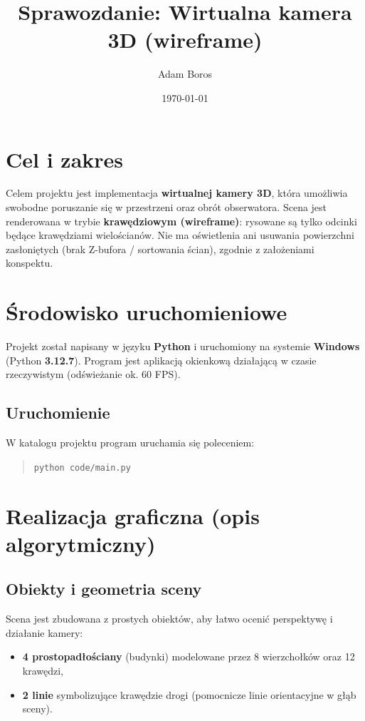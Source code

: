 \documentclass[12pt,a4paper]{article}
\title{Sprawozdanie: Wirtualna kamera 3D (wireframe)}
\author{Adam Boros}
\date{\today}
\begin{document}
\maketitle

\section{Cel i zakres}
Celem projektu jest implementacja \textbf{wirtualnej kamery 3D}, która umożliwia swobodne poruszanie się w przestrzeni oraz obrót obserwatora.
Scena jest renderowana w trybie \textbf{krawędziowym (wireframe)}: rysowane są tylko odcinki będące krawędziami wielościanów.
Nie ma oświetlenia ani usuwania powierzchni zasłoniętych (brak Z-bufora / sortowania ścian), zgodnie z założeniami konspektu.

\section{Środowisko uruchomieniowe}
Projekt został napisany w języku \textbf{Python} i uruchomiony na systemie \textbf{Windows} (Python \textbf{3.12.7}).
Program jest aplikacją okienkową działającą w czasie rzeczywistym (odświeżanie ok. 60 FPS).

\subsection{Uruchomienie}
W katalogu projektu program uruchamia się poleceniem:
\begin{quote}
\texttt{python code/main.py}
\end{quote}

\section{Realizacja graficzna (opis algorytmiczny)}
\subsection{Obiekty i geometria sceny}
Scena jest zbudowana z prostych obiektów, aby łatwo ocenić perspektywę i działanie kamery:
\begin{itemize}
    \item \textbf{4 prostopadłościany} (budynki) modelowane przez 8 wierzchołków oraz 12 krawędzi,
    \item \textbf{2 linie} symbolizujące krawędzie drogi (pomocnicze linie orientacyjne w głąb sceny).
\end{itemize}
\end{document}
